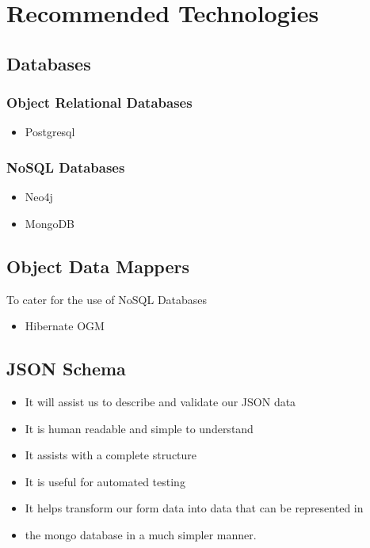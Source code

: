 \section{Recommended Technologies}
\subsection{Databases}
\subsubsection{Object Relational Databases}
\begin{itemize}
	\item Postgresql
\end{itemize}

\subsubsection{NoSQL Databases}
\begin{itemize}
	\item Neo4j
	\item MongoDB
\end{itemize}

\subsection{Object Data Mappers}
To cater for the use of NoSQL Databases
\begin{itemize}
	\item Hibernate OGM
\end{itemize}


\subsection{JSON Schema}
\begin{itemize}
	\item It will assist us to describe and validate our JSON data
	\item It is human readable and simple to understand
	\item It assists with a complete structure
	\item It is useful for automated testing
	\item It helps transform our form data into data that can be represented in
	\item the mongo database in a much simpler manner.
\end{itemize}

